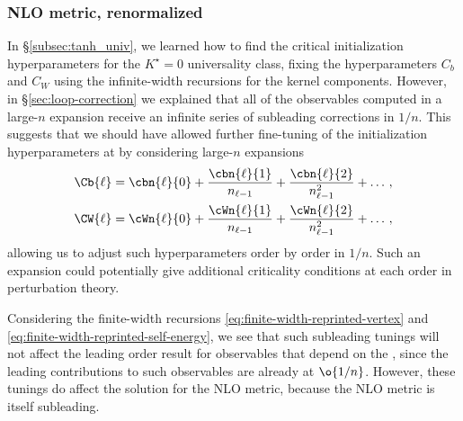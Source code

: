 \subsubsection{NLO metric, renormalized}


In \S\ref{subsec:tanh_univ}, we learned how to find the critical initialization hyperparameters for the $K^\star=0$ universality class, fixing the hyperparameters $C_b$ and $C_W$ using the infinite-width recursions for the kernel components. However, in \S\ref{sec:loop-correction} we explained that all of the observables computed in a large-$n$ expansion receive an infinite series of subleading corrections in $1/n$.  This suggests that we should have allowed further fine-tuning of the initialization hyperparameters at  by considering large-$n$ expansions
\begin{align}
\label{eq:Cb-expansion}
\Cb{\ell} &= \cbn{\ell}{0} + \frac{\cbn{\ell}{1}}{n_{\ell-1}} +\frac{\cbn{\ell}{2}}{n_{\ell-1}^2} + \dots \, , \\
\label{eq:CW-expansion}
\CW{\ell} &= \cWn{\ell}{0} + \frac{\cWn{\ell}{1}}{n_{\ell-1}} +\frac{\cWn{\ell}{2}}{n_{\ell-1}^2} + \dots \, ,
\end{align}
allowing us to adjust such hyperparameters order by order in $1/n$. Such an expansion could potentially give additional criticality conditions at each order in perturbation theory.

Considering the finite-width recursions \eqref{eq:finite-width-reprinted-vertex} and \eqref{eq:finite-width-reprinted-self-energy}, we see that such subleading tunings will not affect the leading order result for observables that depend on the , since the leading contributions to such observables are already at $\o{1/n}$. However, these tunings do affect the solution for the NLO metric, because the NLO metric is itself subleading. 



